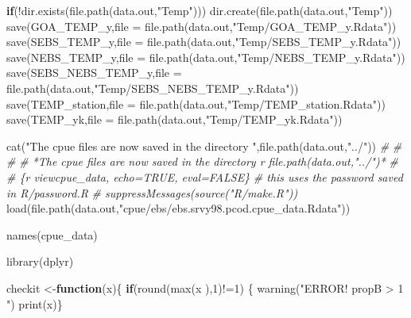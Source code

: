 \documentclass[
]{article}
\newenvironment{Shaded}{\begin{snugshade}}{\end{snugshade}}
\newcommand{\AttributeTok}[1]{\textcolor[rgb]{0.77,0.63,0.00}{#1}}
\newcommand{\CommentTok}[1]{\textcolor[rgb]{0.56,0.35,0.01}{\textit{#1}}}
\newcommand{\ControlFlowTok}[1]{\textcolor[rgb]{0.13,0.29,0.53}{\textbf{#1}}}
\newcommand{\DecValTok}[1]{\textcolor[rgb]{0.00,0.00,0.81}{#1}}
\newcommand{\FunctionTok}[1]{\textcolor[rgb]{0.00,0.00,0.00}{#1}}
\newcommand{\NormalTok}[1]{#1}
\newcommand{\OtherTok}[1]{\textcolor[rgb]{0.56,0.35,0.01}{#1}}
\newcommand{\SpecialCharTok}[1]{\textcolor[rgb]{0.00,0.00,0.00}{#1}}
\newcommand{\StringTok}[1]{\textcolor[rgb]{0.31,0.60,0.02}{#1}}
\begin{document}
\begin{Shaded}
\begin{Highlighting}[]
  
  \ControlFlowTok{if}\NormalTok{(}\SpecialCharTok{!}\FunctionTok{dir.exists}\NormalTok{(}\FunctionTok{file.path}\NormalTok{(data.out,}\StringTok{"Temp"}\NormalTok{)))}
    \FunctionTok{dir.create}\NormalTok{(}\FunctionTok{file.path}\NormalTok{(data.out,}\StringTok{"Temp"}\NormalTok{))}
  \FunctionTok{save}\NormalTok{(GOA\_TEMP\_y,}\AttributeTok{file =} \FunctionTok{file.path}\NormalTok{(data.out,}\StringTok{"Temp/GOA\_TEMP\_y.Rdata"}\NormalTok{))}
  \FunctionTok{save}\NormalTok{(SEBS\_TEMP\_y,}\AttributeTok{file =} \FunctionTok{file.path}\NormalTok{(data.out,}\StringTok{"Temp/SEBS\_TEMP\_y.Rdata"}\NormalTok{))}
  \FunctionTok{save}\NormalTok{(NEBS\_TEMP\_y,}\AttributeTok{file =} \FunctionTok{file.path}\NormalTok{(data.out,}\StringTok{"Temp/NEBS\_TEMP\_y.Rdata"}\NormalTok{))}
  \FunctionTok{save}\NormalTok{(SEBS\_NEBS\_TEMP\_y,}\AttributeTok{file =} \FunctionTok{file.path}\NormalTok{(data.out,}\StringTok{"Temp/SEBS\_NEBS\_TEMP\_y.Rdata"}\NormalTok{))}
  \FunctionTok{save}\NormalTok{(TEMP\_station,}\AttributeTok{file =} \FunctionTok{file.path}\NormalTok{(data.out,}\StringTok{"Temp/TEMP\_station.Rdata"}\NormalTok{))}
  \FunctionTok{save}\NormalTok{(TEMP\_yk,}\AttributeTok{file =} \FunctionTok{file.path}\NormalTok{(data.out,}\StringTok{"Temp/TEMP\_yk.Rdata"}\NormalTok{))}
  
  \FunctionTok{cat}\NormalTok{(}\StringTok{"The cpue files are now saved in the directory "}\NormalTok{,}\FunctionTok{file.path}\NormalTok{(data.out,}\StringTok{"../"}\NormalTok{))}
\CommentTok{\#}
\CommentTok{\# \textasciigrave{}\textasciigrave{}\textasciigrave{}}
\CommentTok{\# }
\CommentTok{\# *The cpue files are now saved in the directory \textasciigrave{}r file.path(data.out,"../")\textasciigrave{}*}
\CommentTok{\# }
\CommentTok{\# \textasciigrave{}\textasciigrave{}\textasciigrave{}\{r viewcpue\_data, echo=TRUE, eval=FALSE\} }
  \CommentTok{\# this uses the password saved in R/password.R}
  \CommentTok{\#  suppressMessages(source("R/make.R"))}
\FunctionTok{load}\NormalTok{(}\FunctionTok{file.path}\NormalTok{(data.out,}\StringTok{"cpue/ebs/ebs.srvy98.pcod.cpue\_data.Rdata"}\NormalTok{))}

\FunctionTok{names}\NormalTok{(cpue\_data)}

\FunctionTok{library}\NormalTok{(dplyr)}

\NormalTok{checkit }\OtherTok{\textless{}{-}}\ControlFlowTok{function}\NormalTok{(x)\{}
   \ControlFlowTok{if}\NormalTok{(}\FunctionTok{round}\NormalTok{(}\FunctionTok{max}\NormalTok{(x ),}\DecValTok{1}\NormalTok{)}\SpecialCharTok{!=}\DecValTok{1}\NormalTok{) \{}
     \FunctionTok{warning}\NormalTok{(}\StringTok{"ERROR! propB \textgreater{} 1 "}\NormalTok{)}
     \FunctionTok{print}\NormalTok{(x)\}}
  

\end{Highlighting}
\end{Shaded}
\end{document}
